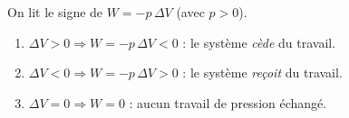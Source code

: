 \documentclass[11pt,a4paper]{article}
\begin{document}
\begin{corrige}
On lit le signe de $W=-p\,\Delta V$ (avec $p>0$).
\begin{enumerate}[label=\alph*)]
  \item $\Delta V>0 \Rightarrow W=-p\,\Delta V<0$ : le système \emph{cède} du travail.
  \item $\Delta V<0 \Rightarrow W=-p\,\Delta V>0$ : le système \emph{reçoit} du travail.
  \item $\Delta V=0 \Rightarrow W=0$ : aucun travail de pression échangé.
\end{enumerate}
\end{corrige}
\end{document}
